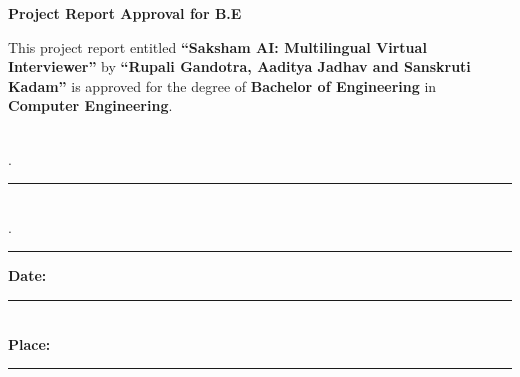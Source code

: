 \documentclass[12pt]{article}
\begin{document}
  

\begin{center}     
    {\Large \textbf{Project Report Approval for B.E}} 
\end{center}  

\vspace{0.5cm}  

\justifying  

This project report entitled \textbf{“Saksham AI: Multilingual Virtual Interviewer”}  
by \textbf{“Rupali Gandotra, Aaditya Jadhav and Sanskruti Kadam”} is approved for the degree of  
\textbf{Bachelor of Engineering} in \textbf{Computer Engineering}.  

\vspace{2cm}   

\begin{flushright} 
\noindent{}\\[2em]
.\ \rule{7cm}{0.4pt} \\[3em]
.\ \rule{7cm}{0.4pt}
\end{flushright}  
  
\vspace{2cm}   
\noindent \textbf{Date:} \rule{5cm}{0.4pt} \\[2em]
\noindent \textbf{Place:} \rule{5cm}{0.4pt}
\end{document}
